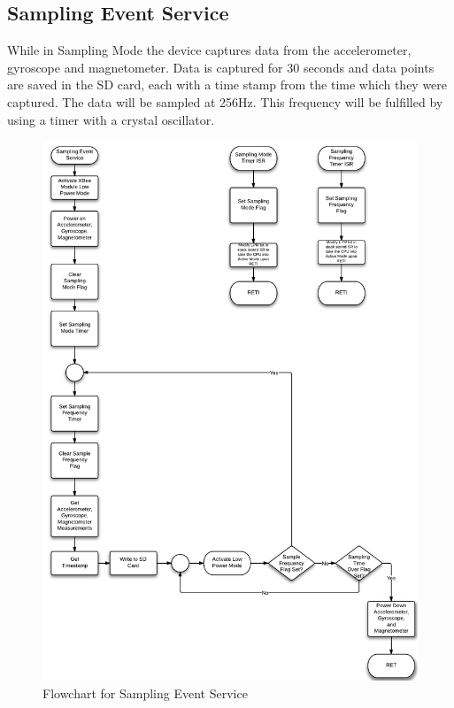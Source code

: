 \subsection{Sampling Event Service}
While in Sampling Mode the device captures data from the accelerometer, gyroscope and magnetometer. Data is captured for 30 seconds and data points are saved in the SD card, each with a time stamp from the time which they were captured. The data will be sampled at 256Hz. This frequency will be fulfilled by using a timer with a crystal oscillator.
\begin{figure}[H]
	\centering
	\includegraphics[width=\textwidth]{img/SamplingEventService}
	\caption{Flowchart for Sampling Event Service \label{fig:samplingMode}}
\end{figure}

